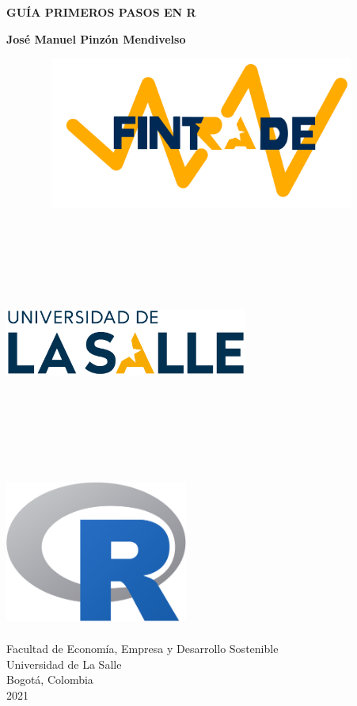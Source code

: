 \begin{titlepage}
    \begin{center}
        \vspace*{1cm}
            
        \Huge
        \textbf{GUÍA PRIMEROS PASOS EN R}
            
        \vspace{0.5cm}
        \LARGE
        \textbf{José Manuel Pinzón Mendivelso}
				
				\includegraphics[width=13cm,height=5cm]{Fintrade}    
            
            
        \vspace{0.5cm}
										
        \includegraphics[width=8cm,height=8cm]{LOGO}    

        \vspace{1.5cm}

        \includegraphics[width=6cm,height=5cm]{R_Project}
				
				\vfill
						
        \Large
        Facultad de Economía, Empresa y Desarrollo Sostenible\\
        Universidad de La Salle\\
        Bogotá, Colombia\\
        2021
            
    \end{center}
\end{titlepage}
